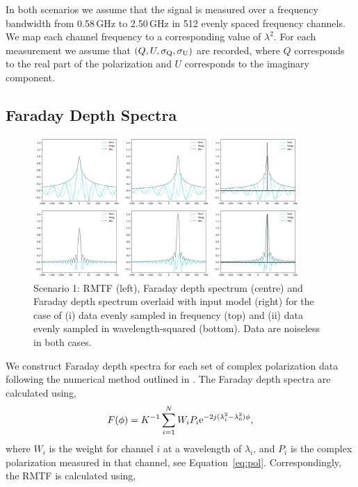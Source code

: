 \documentclass[fleqn,usenatbib]{mnras}
\begin{document}
In both scenarios we assume that the signal is measured over a frequency bandwidth from 0.58\,GHz to 2.50\,GHz in 512 evenly spaced frequency channels. We map each channel frequency to a corresponding value of $\lambda^2$. For each measurement we assume that $(Q, U, \sigma_{\rm Q}, \sigma_{\rm U})$ are recorded, where $Q$ corresponds to the real part of the polarization and $U$ corresponds to the imaginary component.

\subsection{Faraday Depth Spectra}
\label{sec:fdspectra}

%
\begin{figure}
\centerline{\includegraphics[width=0.9\textwidth]{./FIGURES/Scenario1_fsamp.png}}
\centerline{\includegraphics[width=0.9\textwidth]{./FIGURES/Scenario1_lsamp.png}}
\caption{\label{fig:scen1samp} Scenario 1: RMTF (left), Faraday depth spectrum (centre) and Faraday depth spectrum overlaid with input model (right) for the case of (i) data evenly sampled in frequency (top) and (ii) data evenly sampled in wavelength-squared (bottom). Data are noiseless in both cases.}
\end{figure}
%
We construct Faraday depth spectra for each set of complex polarization data following the numerical method outlined in \cite{2005A&A...441.1217B}. The Faraday depth spectra are calculated using,
%
\begin{equation}
F(\phi) = K^{-1}\sum_{i = 1}^{N}{W_i P_i {\rm e}^{-2j (\lambda_i^2 - \lambda_0^2) \phi}},
\end{equation}
%
where $W_i$ is the weight for channel $i$ at a wavelength of $\lambda_i$, and $P_i$ is the complex polarization measured in that channel, see Equation~\ref{eq:pol}. Correspondingly, the RMTF is calculated using,
\end{document}
